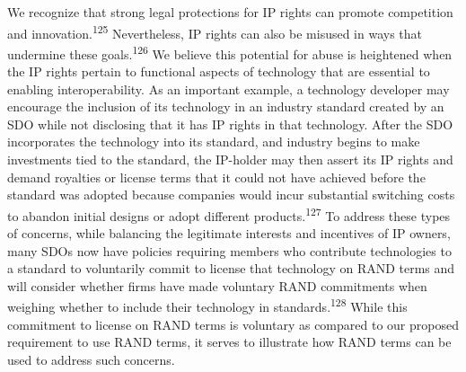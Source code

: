 \documentclass[twoside,11pt]{article}
\begin{document}
          We recognize that strong legal protections for IP rights can promote competition and innovation.\textsuperscript{125}
             Nevertheless, IP rights can also be misused in ways that undermine these goals.\textsuperscript{126}
             We believe this potential for abuse is heightened when the IP rights pertain to functional aspects of technology that are essential to enabling interoperability. As an important example, a technology developer may encourage the inclusion of its technology in an industry standard created by an SDO while not disclosing that it has IP rights in that technology. After the SDO incorporates the technology into its standard, and industry begins to make investments tied to the standard, the IP-holder may then assert its IP rights and demand royalties or license terms that it could not have achieved before the standard was adopted because companies would incur substantial switching costs to abandon initial designs or adopt different products.\textsuperscript{127}
             To address these  \ifhmode\expandafter\xspace\fi types of concerns, while balancing the legitimate interests and incentives of IP owners, many SDOs now have policies requiring members who contribute technologies to a standard to voluntarily commit to license that technology on RAND terms and will consider whether firms have made voluntary RAND commitments when weighing whether to include their technology in standards.\textsuperscript{128}
             While this commitment to license on RAND terms is voluntary as compared to our proposed requirement to use RAND terms, it serves to illustrate how RAND terms can be used to address such concerns.




\end{document}
